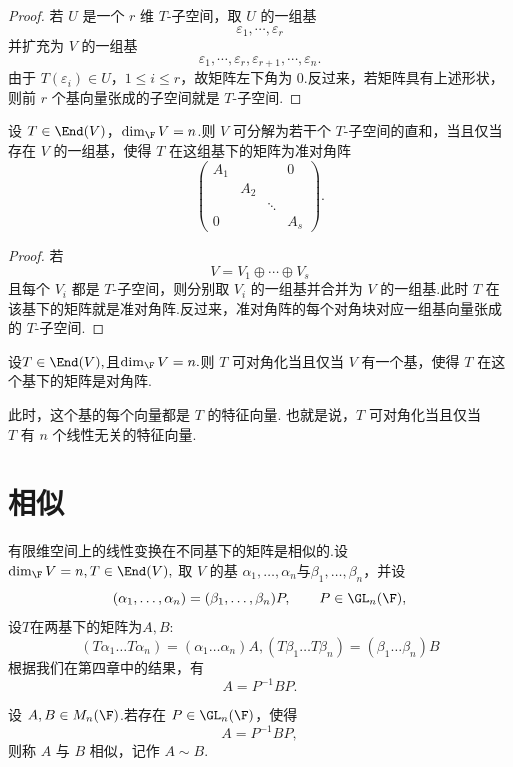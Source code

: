 \begin{proof}
若 $U$ 是一个 $r$ 维 $T$-子空间，取 $U$ 的一组基
\[
\varepsilon_1,\cdots,\varepsilon_r
\]
并扩充为 $V$ 的一组基
\[
\varepsilon_1,\cdots,\varepsilon_r,
\varepsilon_{r+1},\cdots,\varepsilon_n.
\]
由于 $T(\varepsilon_i)\in U$，$1\leq i\leq r$，故矩阵左下角为 $0$.反过来，若矩阵具有上述形状，则前 $r$ 个基向量张成的子空间就是 $T$-子空间.
\end{proof}

\begin{corollary}
设 $T\in\End(V)$，$\dim_{\F}V=n$.则 $V$ 可分解为若干个 $T$-子空间的直和，当且仅当存在 $V$ 的一组基，使得 $T$ 在这组基下的矩阵为准对角阵
\[
\begin{pmatrix}
	A_1&&&0\\
	&A_2&&\\
	&&\ddots&\\
	0&&&A_s
\end{pmatrix}.
\]
\end{corollary}

\begin{proof}
若
\[
V=V_1\oplus\cdots\oplus V_s
\]
且每个 $V_i$ 都是 $T$-子空间，则分别取 $V_i$ 的一组基并合并为 $V$ 的一组基.此时 $T$ 在该基下的矩阵就是准对角阵.反过来，准对角阵的每个对角块对应一组基向量张成的 $T$-子空间.
\end{proof}
\begin{corollary}
	设$T \in \End(V),$且$\dim_{\F} V = n.$则 \(T\) 可对角化当且仅当 \(V\) 有一个基，使得 \(T\) 在这个基下的矩阵是对角阵.
	
	此时，这个基的每个向量都是 \(T\) 的特征向量.
	也就是说，$	T \text{ 可对角化}$当且仅当
	$T \text{ 有 } n \text{ 个线性无关的特征向量}.$
\end{corollary}
\section{相似}

有限维空间上的线性变换在不同基下的矩阵是相似的.设$\dim_{\F}V=n,
 T\in\End(V),$
取 $V$ 的基 $\alpha_1,\ldots,\alpha_n$与$\beta_1,\ldots,\beta_n$，并设
\[
(\alpha_1,\ldots,\alpha_n)=(\beta_1,\ldots,\beta_n)P,
\qquad P\in \GL_n(\F),
\]
设$T$在两基下的矩阵为$A,B$:
\[
(T\alpha_1\ldots T\alpha_n)
=(\alpha_1\ldots\alpha_n)A,
(T\beta_1\ldots T\beta_n)=(\beta_1\ldots\beta_n)B
\]
根据我们在第四章中的结果，有
\[
A=P^{-1}BP.
\]

\begin{definition}
	设 $A,B\in M_n(\F)$.若存在 $P\in \GL_n(\F)$，使得
	\[
	A=P^{-1}BP,
	\]
	则称 $A$ 与 $B$ 相似，记作 $A\sim B$.
\end{definition}


